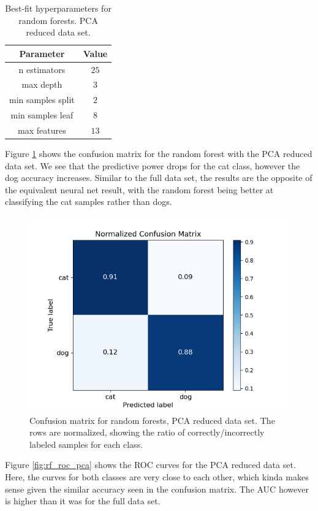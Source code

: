 \documentclass[a4paper]{article}
\begin{document}
\begin{table}[H]
  \centering
  \caption{Best-fit hyperparameters for random forests. PCA reduced data set.}
  \label{tab:best_fit_rf_pca}
  \begin{tabular}{c|c}
    \hline\hline
    Parameter & Value\\\hline
    n estimators &  $25$\\
    max depth &  $3$\\
    min samples split & $2$ \\
    min samples leaf  & $8$\\
    max features & $13$ %
    \end{tabular}
\end{table}
Figure \ref{fig:rf_confusion_pca} shows the confusion matrix for the random forest with the PCA reduced data set. We see that the predictive power drops for the cat class, however the dog accuracy increases. Similar to the full data set, the results are the opposite of the equivalent neural net result, with the random forest being better at classifying the cat samples rather than dogs.
\begin{figure}[H]
	\centering
	\includegraphics[scale=0.7]{../figures/random_forest/confusion_matrix_nbins200_pca35_seed4155_ts0.20.png}
	\caption{Confusion matrix for random forests, PCA reduced data set. The rows are normalized, showing the ratio of correctly/incorrectly labeled samples for each class.}
	\label{fig:rf_confusion_pca}
\end{figure}	
Figure \ref{fig:rf_roc_pca} shows the ROC curves for the PCA reduced data set. Here, the curves for both classes are very close to each other, which kinda makes sense given the similar accuracy seen in the confusion matrix. The AUC however is higher than it was for the full data set.
\end{document}
